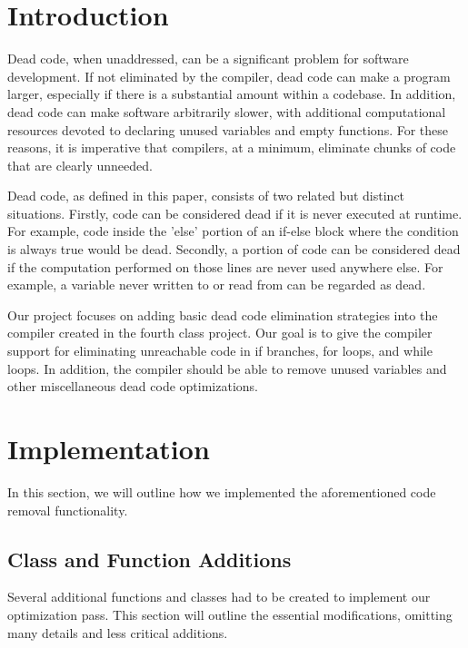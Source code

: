 \documentclass[sigconf]{acmart}
\begin{document}
\maketitle

\section{Introduction}
Dead code, when unaddressed, can be a significant problem for software development.
If not eliminated by the compiler, dead code can make a program 
larger, especially if there is a substantial amount within a codebase. In addition, dead code 
can make software arbitrarily slower, with additional computational resources devoted 
to declaring unused variables and empty functions. For these reasons, it is imperative that compilers, at 
a minimum, eliminate chunks of code that are clearly unneeded.

Dead code, as defined in this paper, consists of 
two related but distinct situations. Firstly, code can be considered dead if 
it is never executed at runtime. For example, code inside the 'else' portion 
of an if-else block where the condition is always true would be dead. Secondly, a portion of 
code can be considered dead if the computation performed on those lines are never used anywhere else.
For example, a variable never written to or read from can be regarded as dead. 

Our project focuses on adding basic dead code elimination strategies into the compiler 
created in the fourth class project. Our goal is to give the compiler support for eliminating
unreachable code in if branches, for loops, and while loops. In addition, the compiler should 
be able to remove unused variables and other miscellaneous dead code optimizations. 

\section{Implementation}
In this section, we will outline how we implemented the aforementioned code removal functionality.

\subsection{Class and Function Additions}
Several additional functions and classes had to be created to implement our optimization pass.
This section will outline the essential modifications, omitting many details and less critical additions.
\end{document}
